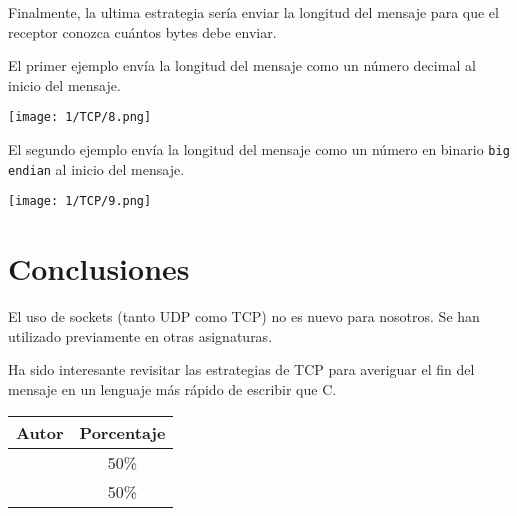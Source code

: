 Finalmente, la ultima estrategia sería enviar la longitud del mensaje
para que el receptor conozca cuántos bytes debe enviar.

El primer ejemplo envía la longitud del mensaje como un número decimal
al inicio del mensaje.

\begin{minipage}{\linewidth}
	\centering
	\texttt{[image: 1/TCP/8.png]}
	\label{fig:1/10}
\end{minipage}

El segundo ejemplo envía la longitud del mensaje como un número en binario
\verb#big endian# al inicio del mensaje.

\begin{minipage}{\linewidth}
	\centering
	\texttt{[image: 1/TCP/9.png]}
	\label{fig:1/11}
\end{minipage}

\section{Conclusiones}

El uso de sockets (tanto UDP como TCP) no es nuevo para nosotros.
Se han utilizado previamente en otras asignaturas.

Ha sido interesante revisitar las estrategias de TCP para averiguar
el fin del mensaje en un lenguaje más rápido de escribir que C.

\begin{center}
	\begin{tabular}{|c|c|}
		\hline
		\textbf{Autor} & \textbf{Porcentaje} \\
		\hline
		\hline
		\authorOne & 50\% \\
		\authorTwo & 50\% \\
		\hline
	\end{tabular}
\end{center}
